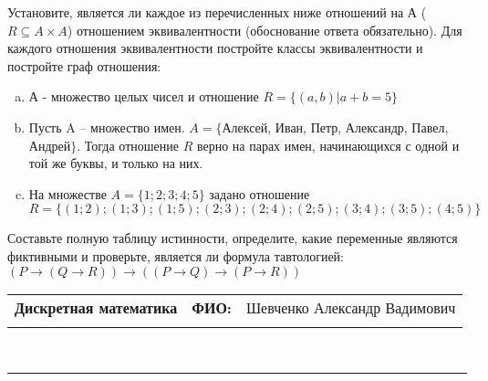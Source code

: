 \documentclass[10pt]{exam}
\newcommand{\class}{Дискретная математика}
\newcommand{\examdate}{}
\begin{document}
\begin{questions}
\question
Установите, является ли каждое из перечисленных ниже отношений на А ($R \subseteq A \times A$) отношением эквивалентности (обоснование ответа обязательно). Для каждого отношения эквивалентности постройте классы 
эквивалентности и постройте граф отношения:
\begin{enumerate} [a)]\setcounter{enumi}{0}
\item А - множество целых чисел и отношение $R = \{(a,b)|a + b = 5\}$
\item Пусть A – множество имен. $A = \{ $Алексей, Иван, Петр, Александр, Павел, Андрей$ \}$. Тогда отношение $R $ верно на парах имен, начинающихся с одной и той же буквы, и только на них.
\item На множестве $A = \{1; 2; 3; 4; 5\}$ задано отношение $R = \{(1; 2); (1; 3); (1; 5); (2; 3); (2; 4); (2; 5); (3; 4); (3; 5); (4; 5)\}$
\end{enumerate}\question Составьте полную таблицу истинности, определите, какие переменные являются фиктивными и проверьте, является ли формула тавтологией:
$(P \rightarrow (Q \rightarrow R)) \rightarrow ((P \rightarrow Q) \rightarrow (P \rightarrow R))$

\end{questions}
\newpage
\begin{flushright}
\begin{tabular}{p{2.8in} r l}
\textbf{\class} & \textbf{ФИО:} &Шевченко Александр Вадимович
\\

\textbf{\examdate} &&\\
\end{tabular}\\
\end{flushright}
\rule[1ex]{\textwidth}{.1pt}
\end{document}

